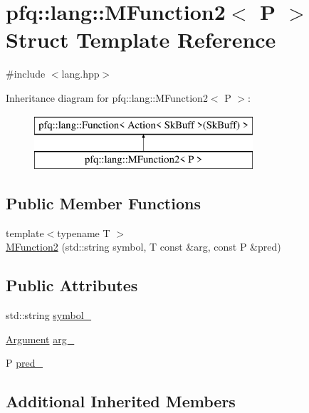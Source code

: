 \hypertarget{structpfq_1_1lang_1_1MFunction2}{\section{pfq\+:\+:lang\+:\+:M\+Function2$<$ P $>$ Struct Template Reference}
\label{structpfq_1_1lang_1_1MFunction2}
}


{\ttfamily \#include $<$lang.\+hpp$>$}

Inheritance diagram for pfq\+:\+:lang\+:\+:M\+Function2$<$ P $>$\+:\begin{figure}[H]
\begin{center}
\leavevmode
\includegraphics[height=2.000000cm]{structpfq_1_1lang_1_1MFunction2}
\end{center}
\end{figure}
\subsection*{Public Member Functions}
\begin{DoxyCompactItemize}
\item 
{\footnotesize template$<$typename T $>$ }\\\hyperlink{structpfq_1_1lang_1_1MFunction2_a93b02748a7cde8d7c59f95411e0f714a}{M\+Function2} (std\+::string symbol, T const \&arg, const P \&pred)
\end{DoxyCompactItemize}
\subsection*{Public Attributes}
\begin{DoxyCompactItemize}
\item 
std\+::string \hyperlink{structpfq_1_1lang_1_1MFunction2_a74137a8065d53ce354c03718b5724d50}{symbol\+\_\+}
\item 
\hyperlink{structpfq_1_1lang_1_1Argument}{Argument} \hyperlink{structpfq_1_1lang_1_1MFunction2_a4f7c22f4fe50fe26f130d736303d75fa}{arg\+\_\+}
\item 
P \hyperlink{structpfq_1_1lang_1_1MFunction2_a55acfd3493eb2369c4591e3ecb4a8d33}{pred\+\_\+}
\end{DoxyCompactItemize}
\subsection*{Additional Inherited Members}


